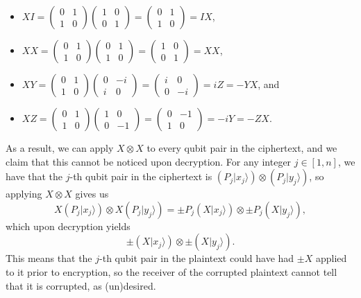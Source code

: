 \documentclass{article}
\begin{document}
\begin{itemize}
\begin{itemize}
                  \item $XI=\begin{pmatrix}0&1\\1&0\end{pmatrix}\begin{pmatrix}1&0\\0&1\end{pmatrix}=\begin{pmatrix}0&1\\1&0\end{pmatrix}=IX$,
                  \item $XX=\begin{pmatrix}0&1\\1&0\end{pmatrix}\begin{pmatrix}0&1\\1&0\end{pmatrix}=\begin{pmatrix}1&0\\0&1\end{pmatrix}=XX$,
                  \item $XY=\begin{pmatrix}0&1\\1&0\end{pmatrix}\begin{pmatrix}0&-i\\i&0\end{pmatrix}=\begin{pmatrix}i&0\\0&-i\end{pmatrix}=iZ=-YX$, and
                  \item $XZ=\begin{pmatrix}0&1\\1&0\end{pmatrix}\begin{pmatrix}1&0\\0&-1\end{pmatrix}=\begin{pmatrix}0&-1\\1&0\end{pmatrix}=-iY=-ZX$.
            \end{itemize}
            As a result, we can apply $X \otimes X$ to every qubit pair in the ciphertext, and we claim that this cannot be noticed upon decryption. For any integer $j \in [1, n]$, we have that the $j$-th qubit pair in the ciphertext is $(P_j|x_j\rangle) \otimes (P_j|y_j\rangle)$, so applying $X \otimes X$ gives us $$X(P_j|x_j\rangle) \otimes X(P_j|y_j\rangle) = \pm P_j(X|x_j\rangle) \otimes \pm P_j(X|y_j\rangle),$$ which upon decryption yields $$\pm (X|x_j\rangle) \otimes \pm (X|y_j\rangle).$$ This means that the $j$-th qubit pair in the plaintext could have had $\pm X$ applied to it prior to encryption, so the receiver of the corrupted plaintext cannot tell that it is corrupted, as (un)desired.
\end{itemize}
\end{document}
